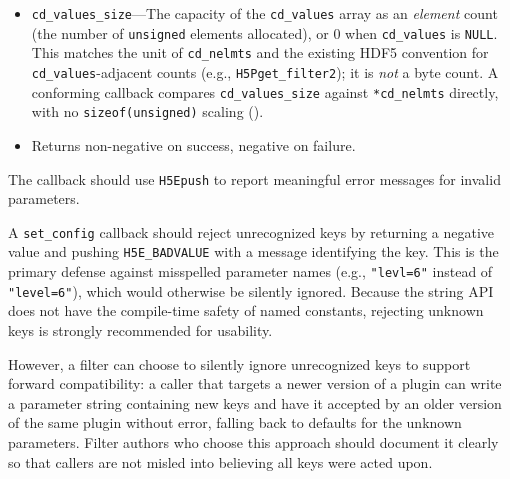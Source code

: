 \documentclass[../RFC-HDFG-2026-001.tex]{subfiles}
\begin{document}
\begin{itemize}
  The library also verifies that \texttt{cd\_nelmts} does not exceed
  \texttt{UINT16\_MAX}, the current file-format limit on the number of
  \texttt{cd\_values} elements per filter entry.  A callback returning a count
  larger than this is rejected with \texttt{H5E\_BADVALUE}.  The parameter
  type is \texttt{size\_t} rather than a narrower type so that the limit can be
  raised in a future format revision without changing the callback signature.
  Note: the per-string token count is separately bounded by
  \texttt{H5Z\_CONFIG\_MAX\_PARAMS} (64), a parser-level limit applied before
  \texttt{set\_config} is ever invoked ().
\item \texttt{cd\_values\_size}---The capacity of the \texttt{cd\_values} array as an
  \emph{element} count (the number of \texttt{unsigned} elements allocated), or
  0 when \texttt{cd\_values} is \texttt{NULL}.  This matches the unit of
  \texttt{cd\_nelmts} and the existing HDF5 convention for
  \texttt{cd\_values}-adjacent counts (e.g., \texttt{H5Pget\_filter2}); it is
  \emph{not} a byte count.  A conforming callback compares
  \texttt{cd\_values\_size} against \texttt{*cd\_nelmts} directly, with no
  \texttt{sizeof(unsigned)} scaling
  ().
\item Returns non-negative on success, negative on failure.
\end{itemize}

The callback should use \texttt{H5Epush} to report meaningful error messages for
invalid parameters.

A \texttt{set\_config} callback should reject unrecognized keys by returning a
negative value and pushing \texttt{H5E\_BADVALUE} with a message identifying the
key.  This is the primary defense against misspelled parameter names (e.g.,
\texttt{"levl=6"} instead of \texttt{"level=6"}), which would otherwise be
silently ignored.  Because the string API does not have the compile-time safety
of named constants, rejecting unknown keys is strongly recommended for
usability.

However, a filter can choose to silently ignore unrecognized keys to support
forward compatibility: a caller that targets a newer version of a plugin can
write a parameter string containing new keys and have it accepted by an older
version of the same plugin without error, falling back to defaults for the
unknown parameters.  Filter authors who choose this approach should document it
clearly so that callers are not misled into believing all keys were acted upon.
\end{document}
